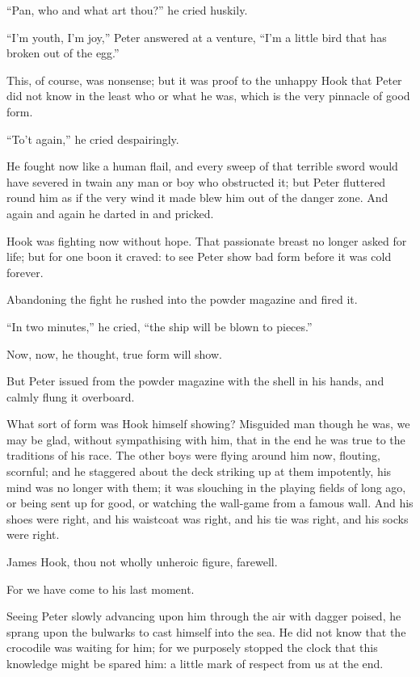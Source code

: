 ``Pan, who and what art thou?'' he cried huskily.

``I'm youth, I'm joy,'' Peter answered at a venture, ``I'm a little bird
that has broken out of the egg.''

This, of course, was nonsense; but it was proof to the unhappy Hook
that Peter did not know in the least who or what he was, which is the
very pinnacle of good form.

``To't again,'' he cried despairingly.

He fought now like a human flail, and every sweep of that terrible
sword would have severed in twain any man or boy who obstructed it; but
Peter fluttered round him as if the very wind it made blew him out of
the danger zone. And again and again he darted in and pricked.

Hook was fighting now without hope. That passionate breast no longer
asked for life; but for one boon it craved: to see Peter show bad form
before it was cold forever.

Abandoning the fight he rushed into the powder magazine and fired it.

``In two minutes,'' he cried, ``the ship will be blown to pieces.''

Now, now, he thought, true form will show.

But Peter issued from the powder magazine with the shell in his hands,
and calmly flung it overboard.

What sort of form was Hook himself showing? Misguided man though he
was, we may be glad, without sympathising with him, that in the end he
was true to the traditions of his race. The other boys were flying
around him now, flouting, scornful; and he staggered about the deck
striking up at them impotently, his mind was no longer with them; it
was slouching in the playing fields of long ago, or being sent up for
good, or watching the wall-game from a famous wall. And his shoes were
right, and his waistcoat was right, and his tie was right, and his
socks were right.

James Hook, thou not wholly unheroic figure, farewell.

For we have come to his last moment.

Seeing Peter slowly advancing upon him through the air with dagger
poised, he sprang upon the bulwarks to cast himself into the sea. He
did not know that the crocodile was waiting for him; for we purposely
stopped the clock that this knowledge might be spared him: a little
mark of respect from us at the end.

